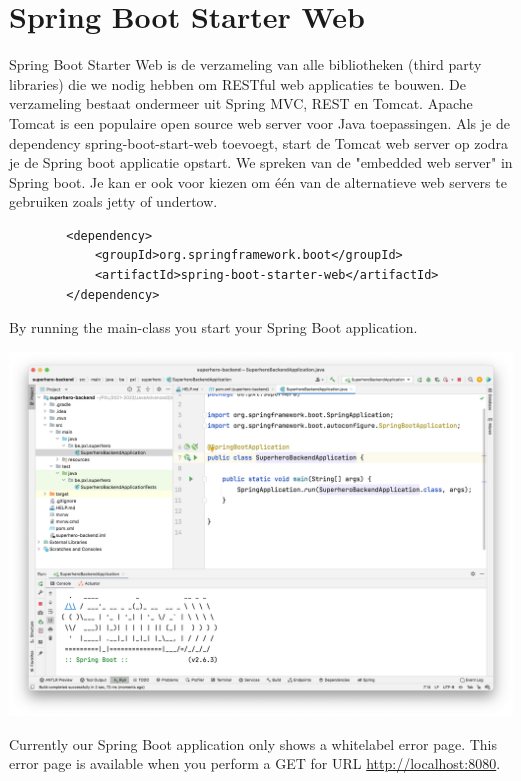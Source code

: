 \section{Spring Boot Starter Web}

Spring Boot Starter Web is de verzameling van alle bibliotheken (third party libraries) die we nodig hebben om RESTful web applicaties te bouwen.  De verzameling bestaat ondermeer uit Spring MVC,  REST en Tomcat. 
Apache Tomcat is een populaire open source web server voor Java toepassingen.  Als je de dependency spring-boot-start-web toevoegt, start de Tomcat web server op zodra je de Spring boot applicatie opstart.  We spreken van de "embedded web server" in Spring boot.  Je kan er ook voor kiezen om  \'e\'en van de alternatieve web servers te gebruiken zoals jetty of undertow.

\begin{lstlisting}
		<dependency>
			<groupId>org.springframework.boot</groupId>
			<artifactId>spring-boot-starter-web</artifactId>
		</dependency>
		\end{lstlisting}
		
		
By running the main-class you start your Spring Boot application. 

\includegraphics[width=\textwidth]{./images/chapter2/first-run.png}

Currently our Spring Boot application only shows a whitelabel error page. This error page is available when you perform a GET for URL \url{http://localhost:8080}.


